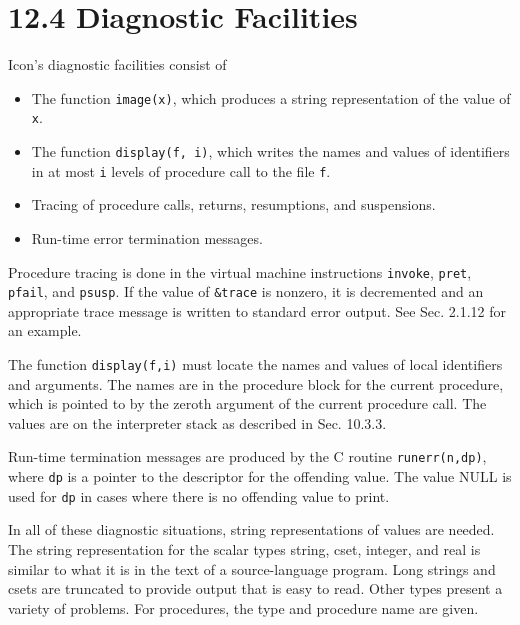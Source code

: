 \section[12.4 Diagnostic Facilities]{12.4 Diagnostic Facilities}

Icon's diagnostic facilities consist of

\liststyleLxvii
\begin{itemize}

\item The function \texttt{image(x)}, which produces a string
representation of the value of \texttt{x}.

\item The function \texttt{display(f, i)}, which writes the names and
values of identifiers in at most \texttt{i} levels of procedure call
to the file \texttt{f}.

\item Tracing of procedure calls, returns, resumptions, and suspensions.

\item Run-time error termination messages.

\end{itemize}

Procedure tracing is done in the virtual machine instructions \texttt{invoke},
\texttt{pret}, \texttt{pfail}, and \texttt{psusp}. If the value of \texttt{\&trace} is nonzero,
it is decremented and an appropriate trace message is written to
standard error output.  See Sec. 2.1.12 for an example.

The function \texttt{display(f,i)} must locate the names and values of
local identifiers and arguments. The names are in the procedure block
for the current procedure, which is pointed to by the zeroth argument
of the current procedure call. The values are on the interpreter stack
as described in Sec. 10.3.3.

Run-time termination messages are produced by the C routine
\texttt{runerr(n,dp)}, where \texttt{dp} is a pointer to the
descriptor for the offending value. The value NULL is used for
\texttt{dp} in cases where there is no offending value to print.

In all of these diagnostic situations, string representations of
values are needed. The string representation for the
{\textquotedbl}scalar{\textquotedbl} types string, cset, integer, and
real is similar to what it is in the text of a source-language
program. Long strings and csets are truncated to provide output that
is easy to read. Other types present a variety of problems. For
procedures, the type and procedure name are given.

